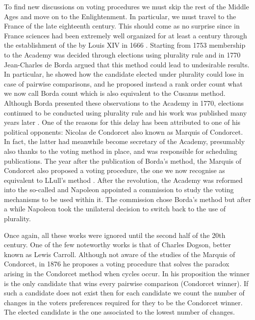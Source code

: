 To find new discussions on voting procedures we must skip the rest of the Middle Ages and move on to the Enlightenment. In particular, we must travel to the France of the late eighteenth century. This should come as no surprise since in France sciences had been extremely well organized for at least a century through the establishment of the  by Louis XIV in 1666 \citep{Demeulenaere1995}. Starting from 1753 membership to the Academy was decided through elections using plurality rule and in 1770 Jean-Charles de Borda argued that this method could lead to undesirable results. In particular, he showed how the candidate elected under plurality could lose in case of pairwise comparisons, and he proposed instead a rank order count \textemdash what we now call Borda count which is also equivalent to the Cusanus method. Although Borda presented these observations to the Academy in 1770, elections continued to be conducted using plurality rule and his work was published many years later \citep{Borda1784}.
One of the reasons for this delay has been attributed to one of his political opponents: Nicolas de Condorcet \citep{Urken2004} \textemdash also known as Marquis of Condorcet. In fact, the latter had meanwhile become secretary of the Academy, presumably also thanks to the voting method in place, and was responsible for scheduling publications. %
The year after the publication of Borda's method, the Marquis of Condorcet also proposed a voting procedure, the one we now recognise as equivalent to LLull's method \citep{Condorcet1785}.
After the revolution, the Academy was reformed into the so-called  and Napoleon appointed a commission to study the voting mechanisms to be used within it. The commission chose Borda's method but after a while Napoleon took the unilateral decision to switch back to the use of plurality.

Once again, all these works were ignored until the second half of the 20th century. One of the few noteworthy works is that of Charles Dogson, better known as Lewis Carroll. Although not aware of the studies of the Marquis of Condorcet, in 1876 he proposes a voting procedure that solves the paradox arising in the Condorcet method when cycles occur.
In his proposition the winner is the only candidate that wins every pairwise comparison (Condorcet winner). If such a candidate does not exist then for each candidate we count the number of changes in the voters preferences required for they to be the Condorcet winner. The elected candidate is the one associated to the lowest number of changes.

